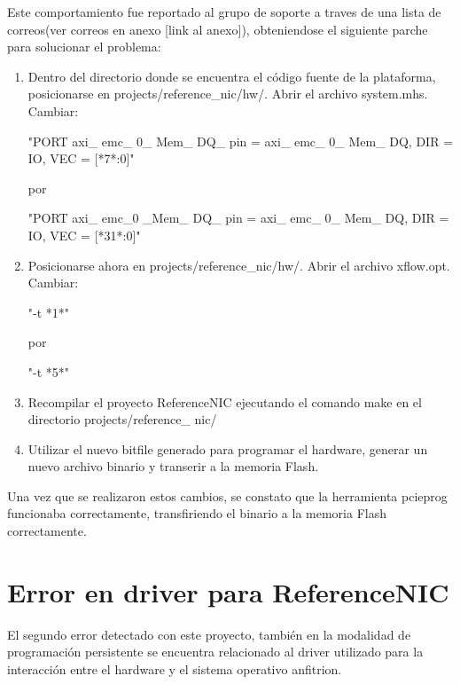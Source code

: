 Este comportamiento fue reportado al grupo de soporte a traves de una lista de correos(ver correos en anexo [link al anexo]), obteniendose el siguiente parche para solucionar el problema:

\begin{enumerate}
\item Dentro del directorio donde se encuentra el c\'odigo fuente de la plataforma, posicionarse en 
	  projects/reference\_nic/hw/. Abrir el archivo system.mhs.\\
	  Cambiar:
\begin{center}
	"PORT axi\_ emc\_ 0\_ Mem\_ DQ\_ pin = axi\_ emc\_ 0\_ Mem\_ DQ, DIR = IO, VEC = [*7*:0]"
\end{center}
por
\begin{center}
"PORT axi\_ emc\_0 \_Mem\_ DQ\_ pin = axi\_ emc\_ 0\_ Mem\_ DQ, DIR = IO, VEC = [*31*:0]"
\end{center}

\item Posicionarse ahora en projects/reference\_nic/hw/. Abrir el archivo xflow.opt.\\
	  Cambiar:
\begin{center}
"-t *1*"
\end{center}
por
\begin{center}
"-t *5*"
\end{center}

\item Recompilar el proyecto ReferenceNIC ejecutando el comando make en el directorio projects/reference\_ nic/

\item Utilizar el nuevo bitfile generado para programar el hardware, generar un nuevo archivo binario y transerir a la memoria Flash.
\end{enumerate}

Una vez que se realizaron estos cambios, se constato que la herramienta pcieprog funcionaba correctamente, transfiriendo el binario a la memoria Flash correctamente.
 
\section{Error en driver para ReferenceNIC}
El segundo error detectado con este proyecto, tambi\'en en la modalidad de programaci\'on persistente  se encuentra relacionado al driver utilizado para la interacci\'on entre el hardware y el sistema operativo anfitrion.\\

